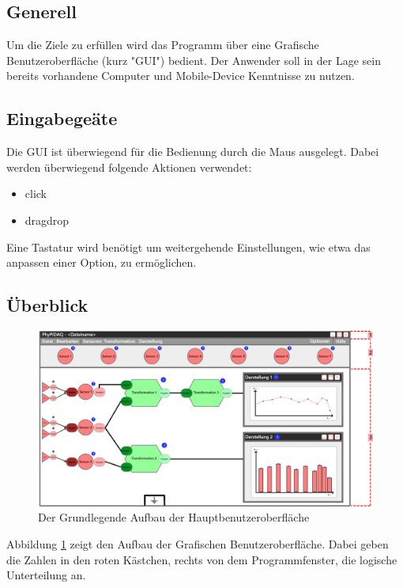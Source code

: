 \documentclass[parskip=full]{scrartcl}
\begin{document}
\subsection{Generell}

Um die Ziele zu erfüllen wird das Programm über eine Grafische Benutzeroberfläche (kurz "GUI") bedient. Der Anwender soll in der Lage sein bereits vorhandene Computer und Mobile-Device Kenntnisse zu nutzen.

\subsection{Eingabegeäte}

Die GUI ist überwiegend für die Bedienung durch die Maus ausgelegt. Dabei werden überwiegend folgende Aktionen verwendet:

\begin{itemize} 
	\item \gls{click}
	\item \gls{dragdrop}
\end{itemize}

Eine Tastatur wird benötigt um weitergehende Einstellungen, wie etwa das anpassen einer Option, zu ermöglichen.



\subsection{Überblick}

\begin{figure}[h]
	\begin{center}
		\includegraphics[width = 12cm]{Grafik/GUI-mit-Segmenten.png}
		\caption{Der Grundlegende Aufbau der Hauptbenutzeroberfläche}
		\label{GUI_Grundlage}
	\end{center}
\end{figure}

Abbildung \ref{GUI_Grundlage} zeigt den Aufbau der Grafischen Benutzeroberfläche. Dabei geben die Zahlen in den roten Kästchen, rechts von dem Programmfenster, die logische Unterteilung an.
\end{document}
